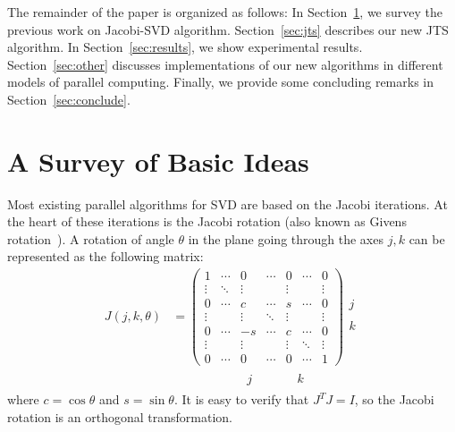 \documentclass[10pt, conference, compsocconf]{IEEEtran}
\begin{document}
The remainder of the paper is organized as follows: In Section~\ref{sec:prevwork}, we survey the previous work on Jacobi-SVD algorithm.  Section~\ref{sec:jts} describes our new JTS algorithm. In Section~\ref{sec:results}, we show experimental results. Section~\ref{sec:other} discusses implementations of our new algorithms in different models of parallel computing. Finally, we provide some concluding remarks in Section~\ref{sec:conclude}.

\section{A Survey of Basic Ideas}
\label{sec:prevwork}

Most existing parallel algorithms for SVD are based on the Jacobi iterations. At the heart of these iterations is the Jacobi rotation (also known as Givens rotation~\cite{golub2012matrix}). A rotation of angle $\theta$ in the plane going through the axes $j,k$ can be represented as the following matrix:
\begin{align}
  J(j,k,\theta) &= \left( \begin{array}{ccccccc} 
  1 & \cdots & 0 & \cdots & 0 & \cdots & 0 \\
  \vdots & \ddots & \vdots & & \vdots & & \vdots \\
  0 & \cdots & c & \cdots & s & \cdots & 0 \\
  \vdots & & \vdots & \ddots  & \vdots & & \vdots \\
  0 & \cdots & -s & \cdots & c & \cdots & 0 \\
  \vdots & & \vdots & & \vdots  & \ddots  & \vdots \\
  0 & \cdots & 0 & \cdots & 0 & \cdots & 1
\end{array} \right)
\begin{array}{l}
  \\
  j \\
  \\
  k
  \\
  \\
\end{array} \\
& \begin{array}{ccccccc}
 \qquad &\qquad & j & \qquad & k & &
\end{array} \nonumber
\end{align}
where $c=\cos \theta$ and $s=\sin \theta$. It is easy to verify that $J^T J = I$, so the Jacobi rotation is an orthogonal transformation.
\end{document}
